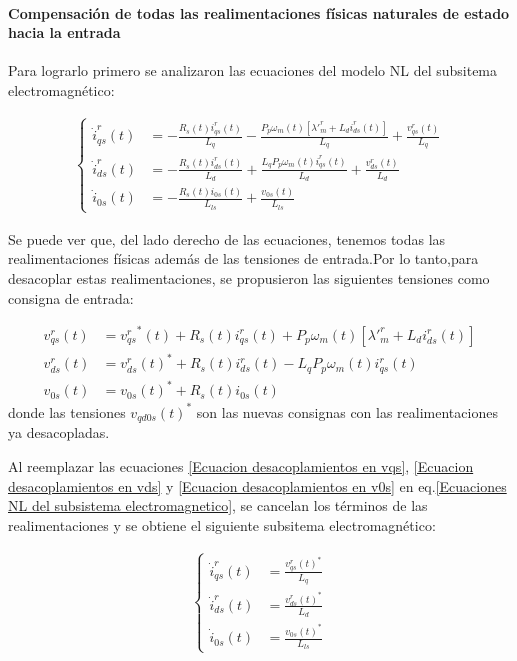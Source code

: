 \documentclass[a4paper, 10pt, onecolumn,journal]{ieeeconf}
\begin{document}
\paragraph{\textbf{Compensación de todas las realimentaciones físicas naturales de estado hacia la entrada}}
Para lograrlo primero se analizaron las ecuaciones del modelo NL del subsitema electromagnético:

\begin{align}
	\begin{cases}
		\dot{i}^r_{qs}(t) &= -\frac{R_s(t) i^r_{qs}(t)}{L_q} - \frac{P_p \omega_m(t) \left[\lambda'^r_m + L_d i^r_{ds}(t)\right]}{L_q} + \frac{v^r_{qs}(t)}{L_q}\\
		\dot{i}^r_{ds}(t) &= -\frac{R_s(t) i^r_{ds}(t)}{L_d} + \frac{L_q P_p \omega_m(t)i^r_{qs}(t)}{L_d}  + \frac{v^r_{ds}(t)}{L_d} \\ 
		\dot{i}_{0s}(t)   &= -\frac{R_s(t) i_{0s}(t)}{L_{ls}} + \frac{v_{0s}(t)}{L_{ls}}
	\end{cases}	\label{Ecuaciones NL del subsistema electromagnetico}
\end{align}

 Se puede ver que, del lado derecho de las ecuaciones, tenemos todas las realimentaciones físicas además de las tensiones de entrada.Por lo tanto,para desacoplar estas realimentaciones, se propusieron las siguientes tensiones como consigna de entrada:
 
 \begin{align}
 	v^r_{qs}(t) &= {v^r_{qs}}^*(t) + R_s(t) i^r_{qs}(t) + P_p \omega_m(t) \left[\lambda'^r_m + L_d i^r_{ds}(t)\right] \label{Ecuacion desacoplamientos en vqs}\\
 	v^r_{ds}(t) &= {v^r_{ds}(t)}^* + R_s(t) i^r_{ds}(t) - L_q P_p \omega_m(t)i^r_{qs}(t) \label{Ecuacion desacoplamientos en vds}\\ 
 	v_{0s}(t)   &= {v_{0s}(t)}^* + R_s(t) i_{0s}(t) \label{Ecuacion desacoplamientos en v0s}
 \end{align}
donde las tensiones  ${v_{qd0s}(t)}^*$ son las nuevas consignas con las realimentaciones ya desacopladas.

Al reemplazar las ecuaciones \eqref{Ecuacion desacoplamientos en vqs}, \eqref{Ecuacion desacoplamientos en vds} y \eqref{Ecuacion desacoplamientos en v0s} en eq.\eqref{Ecuaciones NL del subsistema electromagnetico}, se cancelan los términos de las realimentaciones y se obtiene el siguiente subsitema electromagnético:

\begin{align}
	\begin{cases}
		\dot{i}^r_{qs}(t) &= \frac{{v^r_{qs}(t)}^*}{L_q}\\
		\dot{i}^r_{ds}(t) &= \frac{{v^r_{ds}(t)}^*}{L_d} \\ 
		\dot{i}_{0s}(t)   &= \frac{{v_{0s}(t)}^*}{L_{ls}}
	\end{cases}	\label{Ecuaciones del subsistema electromagnetico sin realimentaciones fisicas}
\end{align}
\end{document}
